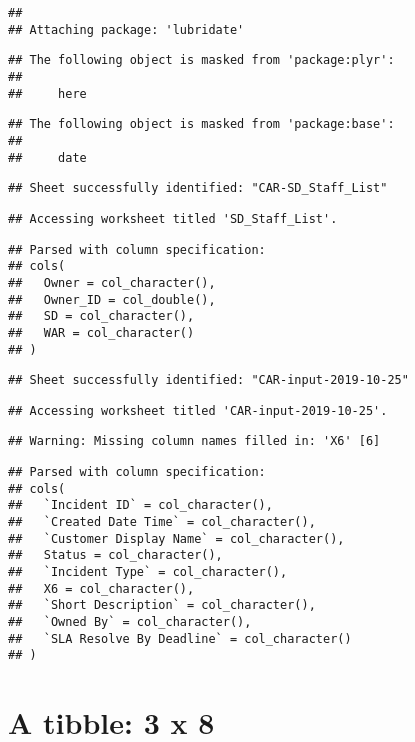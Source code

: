 \documentclass[]{article}
\begin{document}
\begin{verbatim}
## 
## Attaching package: 'lubridate'
\end{verbatim}

\begin{verbatim}
## The following object is masked from 'package:plyr':
## 
##     here
\end{verbatim}

\begin{verbatim}
## The following object is masked from 'package:base':
## 
##     date
\end{verbatim}

\begin{verbatim}
## Sheet successfully identified: "CAR-SD_Staff_List"
\end{verbatim}

\begin{verbatim}
## Accessing worksheet titled 'SD_Staff_List'.
\end{verbatim}

\begin{verbatim}
## Parsed with column specification:
## cols(
##   Owner = col_character(),
##   Owner_ID = col_double(),
##   SD = col_character(),
##   WAR = col_character()
## )
\end{verbatim}

\begin{verbatim}
## Sheet successfully identified: "CAR-input-2019-10-25"
\end{verbatim}

\begin{verbatim}
## Accessing worksheet titled 'CAR-input-2019-10-25'.
\end{verbatim}

\begin{verbatim}
## Warning: Missing column names filled in: 'X6' [6]
\end{verbatim}

\begin{verbatim}
## Parsed with column specification:
## cols(
##   `Incident ID` = col_character(),
##   `Created Date Time` = col_character(),
##   `Customer Display Name` = col_character(),
##   Status = col_character(),
##   `Incident Type` = col_character(),
##   X6 = col_character(),
##   `Short Description` = col_character(),
##   `Owned By` = col_character(),
##   `SLA Resolve By Deadline` = col_character()
## )
\end{verbatim}

\section{A tibble: 3 x 8}\label{a-tibble-3-x-8}
\end{document}
